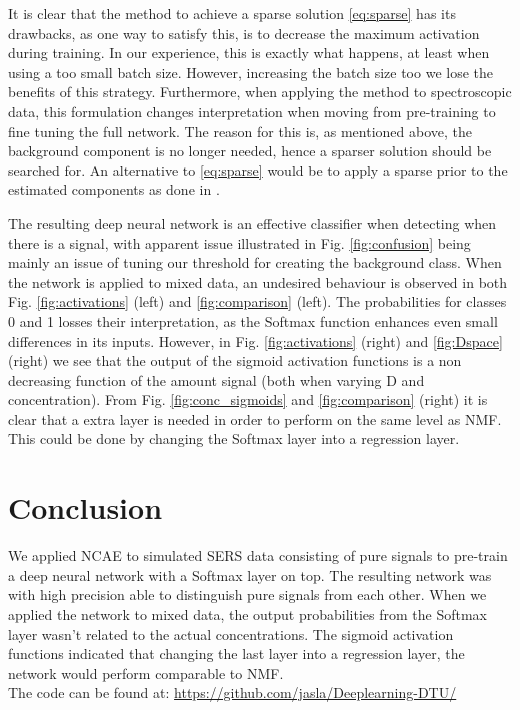 \documentclass{article}
\begin{document}
It is clear that the method to achieve a sparse solution \eqref{eq:sparse} has its drawbacks, as one way to satisfy this, is to decrease the maximum activation during training. In our experience, this is exactly what happens, at least when using a too small batch size. However, increasing the batch size too we lose the benefits of this strategy. Furthermore, when applying the method to spectroscopic data, this formulation changes interpretation when moving from pre-training to fine tuning the full network. The reason for this is, as mentioned above, the background component is no longer needed, hence a sparser solution should be searched for. An alternative to \eqref{eq:sparse} would be to apply a sparse prior to the estimated components as done in \cite{snmf2006,ramanSNMF2014}.

The resulting deep neural network is an effective classifier when detecting when there is a signal, with apparent issue illustrated in Fig. \ref{fig:confusion} being mainly an issue of tuning our threshold for creating the background class. When the network is applied to mixed data, an undesired behaviour is observed in both Fig. \ref{fig:activations} (left) and \ref{fig:comparison} (left). The probabilities for classes 0 and 1 losses their interpretation, as the Softmax function enhances even small differences in its inputs. However, in Fig. \ref{fig:activations} (right) and \ref{fig:Dspace} (right) we see that the output of the sigmoid activation functions is a non decreasing function of the amount signal (both when varying D and concentration). From Fig. \ref{fig:conc_sigmoids} and \ref{fig:comparison} (right) it is clear that a extra layer is needed in order to perform on the same level as NMF. This could be done by changing the Softmax layer into a regression layer.



\section{Conclusion}
\label{sec:conclusion}
We applied NCAE to simulated SERS data consisting of pure signals to pre-train a deep neural network with a Softmax layer on top. The resulting network was with high precision able to distinguish pure signals from each other. When we applied the network to mixed data, the output probabilities from the Softmax layer wasn't related to the actual concentrations. The sigmoid activation functions indicated that changing the last layer into a regression layer, the network would perform comparable to NMF.\\ The code can be found at:
\href{https://github.com/jasla/Deeplearning-DTU/}{https://github.com/jasla/Deeplearning-DTU/} 
\end{document}
